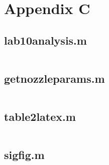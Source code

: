 \chapter{Appendix C}

\section{lab10analysis.m}

\inputminted{matlab}{Code/lab10analysis.m} \label{listing:data_analysis_script}

\section{getnozzleparams.m}

\inputminted{matlab}{Code/getnozzleparams.m} \label{listing:helper_function_script}

\section{table2latex.m}

\inputminted{matlab}{Code/table2latex.m} \label{listing:table2latex_script}

\section{sigfig.m}

\inputminted{matlab}{Code/sigfig.m} \label{listing:sigfig_script}